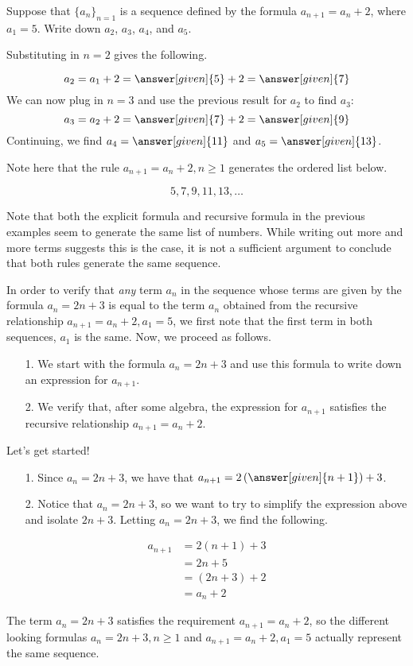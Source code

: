 \documentclass{ximera}
\begin{document}
\begin{example}
 Suppose that $\{a_n\}_{n=1}$ is a sequence defined by the formula $a_{n+1} = a_n+2$, where $a_1 = 5$.  Write down $a_2$, $a_3$, $a_4$, and $a_5$.  
 
 \begin{explanation}
 Substituting in $n=2$ gives the following.
 
 \[
 a_2 = a_{1}+2 = \answer[given]{5}+2 = \answer[given]{7}
 \]
 We can now plug in $n=3$ and use the previous result for $a_2$ to find $a_3$:
  \[
 a_3 = a_{2}+2 = \answer[given]{7}+2 = \answer[given]{9}
 \]
 Continuing, we find $a_4 = \answer[given]{11}$ and $a_5 = \answer[given]{13}$.
 
 

Note here that the rule $a_{n+1} = a_n+2, n \geq 1$ generates the ordered list below.

\[
5,7,9,11,13, \dots
\]   

Note that both the explicit formula and recursive formula in the previous examples seem to generate the same list of numbers.  While writing out more and more terms suggests this is the case, it is not a sufficient argument to conclude that both rules generate the same sequence.  

In order to verify that \emph{any} term $a_n$ in the sequence whose terms are given by the formula $a_n = 2n+3$ is equal to the term $a_n$ obtained from the recursive relationship $a_{n+1}=a_n+2, a_1=5$, we first note that the first term in both sequences, $a_1$ is the same. Now, we proceed as follows.

\begin{itemize}
\item[1.] We start with the formula $a_n=2n+3$ and use this formula to write down an expression for $a_{n+1}$.
\item[2.] We verify that, after some algebra, the expression for $a_{n+1}$ satisfies the recursive relationship $a_{n+1} = a_n+2$.
\end{itemize}

Let's get started!

\begin{itemize}
\item[1.] Since $a_n=2n+3$, we have that $a_{n+1} = 2\left(\answer[given]{n+1}\right)+3$.
\item[2.] Notice that $a_n = 2n+3$, so we want to try to simplify the expression above and isolate $2n+3$.  
Letting $a_n = 2n+3$, we find the following.
\end{itemize}

\begin{align*}
a_{n+1} &= 2\left(n+1\right)+3 \\
&= 2n+5 \\
&= \left(2n+3\right) +2 \\
&= a_n+2
\end{align*}  

The term $a_n = 2n+3$ satisfies the requirement $a_{n+1}=a_n+2$, so the different looking formulas $a_n = 2n+3, n \geq 1$ and $a_{n+1}=a_n+2, a_1=5$ actually represent the same sequence.
\end{explanation}
\end{example}
\end{document}
